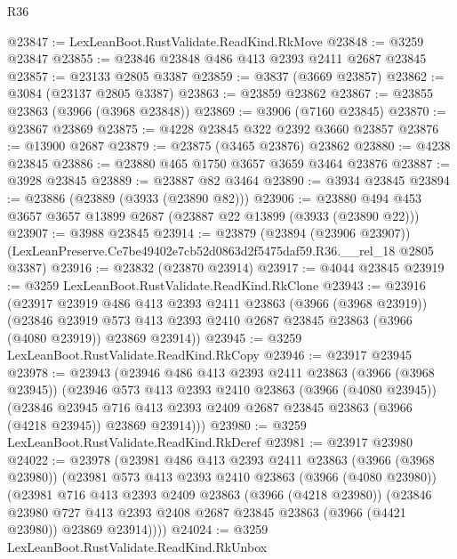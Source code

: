 \begin{lexlean}{R36}
\begin{coremodule}
@23847 := LexLeanBoot.RustValidate.ReadKind.RkMove
@23848 := @3259 @23847
@23855 := @23846 @23848 @486 @413 @2393 @2411 @2687 @23845
@23857 := @23133 @2805 @3387
@23859 := @3837 (@3669 @23857)
@23862 := @3084 (@23137 @2805 @3387)
@23863 := @23859 @23862
@23867 := @23855 @23863 (@3966 (@3968 @23848))
@23869 := @3906 (@7160 @23845)
@23870 := @23867 @23869
@23875 := @4228 @23845 @322 @2392 @3660 @23857
@23876 := @13900 @2687
@23879 := @23875 (@3465 @23876) @23862
@23880 := @4238 @23845
@23886 := @23880 @465 @1750 @3657 @3659 @3464 @23876
@23887 := @3928 @23845
@23889 := @23887 @82 @3464
@23890 := @3934 @23845
@23894 := @23886 (@23889 (@3933 (@23890 @82)))
@23906 := @23880 @494 @453 @3657 @3657 @13899 @2687 (@23887 @22 @13899 (@3933 (@23890 @22)))
@23907 := @3988 @23845
@23914 := @23879
    (@23894 (@23906 @23907))
    (LexLeanPreserve.Ce7be49402e7cb52d0863d2f5475daf59.R36.__rel_18 @2805 @3387)
@23916 := @23832 (@23870 @23914)
@23917 := @4044 @23845
@23919 := @3259 LexLeanBoot.RustValidate.ReadKind.RkClone
@23943 := @23916
    (@23917
      @23919
      @486
      @413
      @2393
      @2411
      @23863
      (@3966 (@3968 @23919))
      (@23846
        @23919
        @573
        @413
        @2393
        @2410
        @2687
        @23845
        @23863
        (@3966 (@4080 @23919))
        @23869
        @23914))
@23945 := @3259 LexLeanBoot.RustValidate.ReadKind.RkCopy
@23946 := @23917 @23945
@23978 := @23943
    (@23946
      @486
      @413
      @2393
      @2411
      @23863
      (@3966 (@3968 @23945))
      (@23946
        @573
        @413
        @2393
        @2410
        @23863
        (@3966 (@4080 @23945))
        (@23846
          @23945
          @716
          @413
          @2393
          @2409
          @2687
          @23845
          @23863
          (@3966 (@4218 @23945))
          @23869
          @23914)))
@23980 := @3259 LexLeanBoot.RustValidate.ReadKind.RkDeref
@23981 := @23917 @23980
@24022 := @23978
    (@23981
      @486
      @413
      @2393
      @2411
      @23863
      (@3966 (@3968 @23980))
      (@23981
        @573
        @413
        @2393
        @2410
        @23863
        (@3966 (@4080 @23980))
        (@23981
          @716
          @413
          @2393
          @2409
          @23863
          (@3966 (@4218 @23980))
          (@23846
            @23980
            @727
            @413
            @2393
            @2408
            @2687
            @23845
            @23863
            (@3966 (@4421 @23980))
            @23869
            @23914))))
@24024 := @3259 LexLeanBoot.RustValidate.ReadKind.RkUnbox

\end{coremodule}
\end{lexlean}

